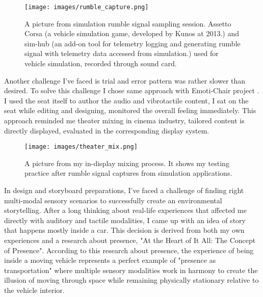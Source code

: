         \begin{figure}[H]
            \centering
            \texttt{[image: images/rumble\_capture.png]}
            \caption{A picture from simulation rumble signal sampling session. Assetto Corsa (a vehicle simulation game, developed by Kunos at 2013.) and sim-hub (an add-on tool for telemetry logging and generating rumble signal with telemetry data accessed from simulation.) used for vehicle simulation, recorded through sound card.}
            \label{fig:RUMBLE_CAPTURE}
        \end{figure}

        Another challenge I've faced is trial and error pattern was rather slower than desired. To solve this challenge I chose same approach with Emoti-Chair project \cite{Composing_Vibrotactile_Music}. I used the seat itself to author the audio and vibrotactile content, I sat on the seat while editing and designing, monitored the overall feeling immediately. This approach reminded me theater mixing in cinema industry, tailored content is directly displayed, evaluated in the corresponding display system.\par

        \begin{figure}[H]
            \centering
            \texttt{[image: images/theater\_mix.png]}
            \caption{A picture from my in-display mixing process. It shows my testing practice after rumble signal captures from simulation applications.}
            \label{fig:THEATER_MIX}
        \end{figure}

        In design and storyboard preparations, I've faced a challenge of finding right multi-modal sensory scenarios to successfully create an environmental storytelling. After a long thinking about real-life experiences that affected me directly with auditory and tactile modalities, I came up with an idea of story that happens mostly inside a car. This decision is derived from both my own experiences and a research about presence, "At the Heart of It All: The Concept of Presence"\cite{Concept_of_Presence}. According to this research about presence, the experience of being inside a moving vehicle represents a perfect example of "presence as transportation" where multiple sensory modalities work in harmony to create the illusion of moving through space while remaining physically stationary relative to the vehicle interior.\par

